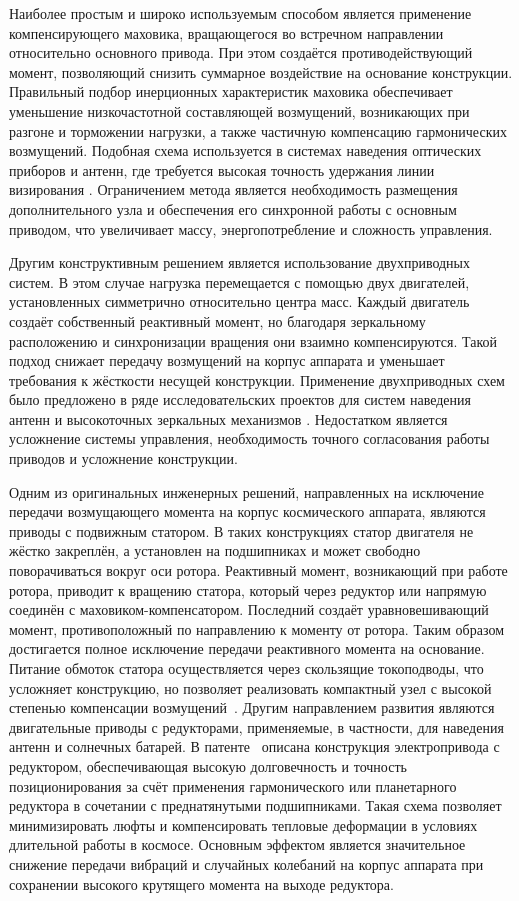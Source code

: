 Наиболее простым и широко используемым способом является применение компенсирующего маховика, вращающегося во встречном направлении относительно основного привода. При этом создаётся противодействующий момент, позволяющий снизить суммарное воздействие на основание конструкции. Правильный подбор инерционных характеристик маховика обеспечивает уменьшение низкочастотной составляющей возмущений, возникающих при разгоне и торможении нагрузки, а также частичную компенсацию гармонических возмущений. Подобная схема используется в системах наведения оптических приборов и антенн, где требуется высокая точность удержания линии визирования \cite{montenbruck2002satellite}. Ограничением метода является необходимость размещения дополнительного узла и обеспечения его синхронной работы с основным приводом, что увеличивает массу, энергопотребление и сложность управления.

Другим конструктивным решением является использование двухприводных систем. В этом случае нагрузка перемещается с помощью двух двигателей, установленных симметрично относительно центра масс. Каждый двигатель создаёт собственный реактивный момент, но благодаря зеркальному расположению и синхронизации вращения они взаимно компенсируются. Такой подход снижает передачу возмущений на корпус аппарата и уменьшает требования к жёсткости несущей конструкции. Применение двухприводных схем было предложено в ряде исследовательских проектов для систем наведения антенн и высокоточных зеркальных механизмов \cite{worthington2010design}. Недостатком является усложнение системы управления, необходимость точного согласования работы приводов и усложнение конструкции.

Одним из оригинальных инженерных решений, направленных на исключение передачи возмущающего момента на корпус космического аппарата, являются приводы с подвижным статором. В таких конструкциях статор двигателя не жёстко закреплён, а установлен на подшипниках и может свободно поворачиваться вокруг оси ротора. Реактивный момент, возникающий при работе ротора, приводит к вращению статора, который через редуктор или напрямую соединён с маховиком-компенсатором. Последний создаёт уравновешивающий момент, противоположный по направлению к моменту от ротора. Таким образом достигается полное исключение передачи реактивного момента на основание. Питание обмоток статора осуществляется через скользящие токоподводы, что усложняет конструкцию, но позволяет реализовать компактный узел с высокой степенью компенсации возмущений~\cite{RU2646002C2}. Другим направлением развития являются двигательные приводы с редукторами, применяемые, в частности, для наведения антенн и солнечных батарей. В патенте~\cite{RU2466069C2} описана конструкция электропривода с редуктором, обеспечивающая высокую долговечность и точность позиционирования за счёт применения гармонического или планетарного редуктора в сочетании с преднатянутыми подшипниками. Такая схема позволяет минимизировать люфты и компенсировать тепловые деформации в условиях длительной работы в космосе. Основным эффектом является значительное снижение передачи вибраций и случайных колебаний на корпус аппарата при сохранении высокого крутящего момента на выходе редуктора.

